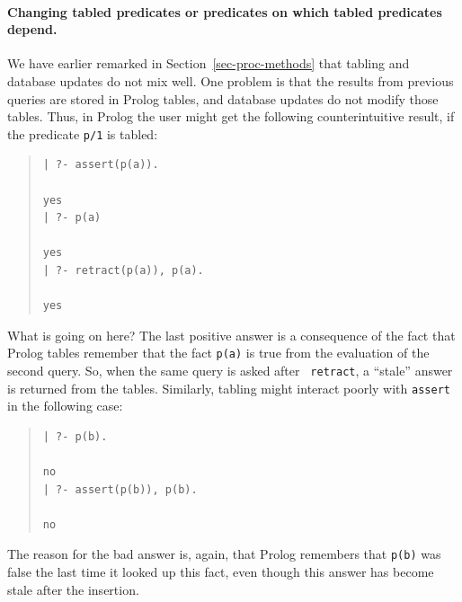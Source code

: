 \documentclass[11pt]{article}
\begin{document}
\paragraph{Changing tabled predicates or predicates on which tabled
  predicates depend.}
We have earlier remarked in Section~\ref{sec-proc-methods} that tabling and
database updates do not mix well.  One problem is that the results from
previous queries are stored in Prolog tables, and database updates do not
modify those tables.  Thus, in Prolog the user might get the following
counterintuitive result, if the predicate {\tt p/1} is tabled:
\begin{quote}
\begin{verbatim}
| ?- assert(p(a)).

yes
| ?- p(a)

yes
| ?- retract(p(a)), p(a).

yes
\end{verbatim}
\end{quote}
What is going on here?  The last positive answer is a consequence of the
fact that Prolog tables remember that the fact {\tt p(a)} is true from the
evaluation of the second query. So, when the same query is asked after {\tt
  retract}, a ``stale'' answer is returned from the tables.  Similarly,
tabling might interact poorly with {\tt assert} in the following case:
\begin{quote}
\begin{verbatim}
| ?- p(b).

no
| ?- assert(p(b)), p(b).

no
\end{verbatim}
\end{quote}
The reason for the bad answer is, again, that Prolog remembers that {\tt p(b)}
was false the last time it looked up this fact, even though this answer
has become stale after the insertion.
\end{document}
